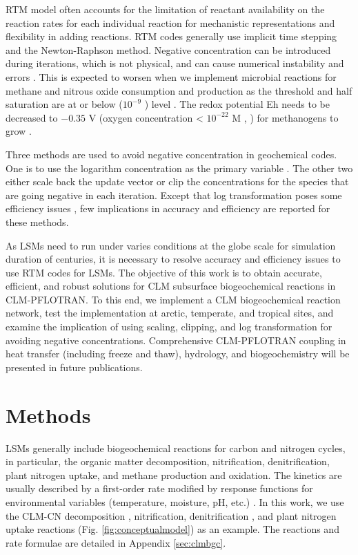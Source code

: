 \documentclass[gmd, manuscript]{copernicus}
\begin{document}
RTM model often accounts for the limitation of reactant availability on the reaction rates for each individual reaction for mechanistic representations and flexibility in adding reactions. RTM codes generally use implicit time stepping and the Newton-Raphson method. Negative concentration can be introduced during iterations, which is not physical, and can cause numerical instability and errors \citep{Shampine2005}. This is expected to worsen when we implement microbial reactions for methane and nitrous oxide consumption and production as the threshold and half saturation are at or below  ($10^{-9}$ ) level \citep{Conrad1996}. The redox potential Eh needs to be decreased to $-0.35$ \unit{V} (oxygen concentration < $10^{-22}$ \unit{M} \citeauthor{Hungate1975}, \citeyear{Hungate1975}) for methanogens to grow \citep{Jarrell1985}. 

Three methods are used to avoid negative concentration in geochemical codes. One is to use the logarithm concentration as the primary variable
\citep{Bethke2007,Hammond2003,Parkhurst1999}. The other two either scale back the update vector \citep{Bethke2007,Hammond2003} or clip the concentrations for the species that are going negative \citep{Yeh2004,White2005,Xu2014} in each iteration. Except that log transformation poses some efficiency issues \citep{Hammond2003}, few implications in accuracy and efficiency are reported  for these methods. 

As LSMs need to run under varies conditions at the globe scale for simulation duration of centuries, it is necessary to resolve accuracy and efficiency
issues to use RTM codes for LSMs. The objective of this work is to obtain accurate, efficient, and robust solutions for CLM subsurface biogeochemical reactions in CLM-PFLOTRAN. To this end, we implement a CLM biogeochemical reaction network, test the implementation at arctic, temperate, and
tropical sites, and examine the implication of using scaling, clipping, and log transformation for avoiding negative concentrations.  Comprehensive CLM-PFLOTRAN coupling in heat transfer (including freeze and thaw), hydrology,  and biogeochemistry will be presented in future publications.  

\section{Methods}
LSMs generally include biogeochemical reactions for carbon and nitrogen cycles, in particular, the organic matter decomposition, nitrification, denitrification, plant nitrogen uptake,  and methane production and oxidation. The kinetics are usually described by a first-order rate modified by response functions for environmental variables (temperature, moisture, pH, etc.) \citep{Bonan2012,Boyer2006,Schmidt2011}.  In this work, we use the CLM-CN decomposition \citep{Bonan2012,Oleson2013,Thornton2005}, nitrification, denitrification \citep{Dickinson2002,Parton2001,Parton1996}, and plant nitrogen uptake reactions (Fig. \ref{fig:conceptualmodel}) as an example. The reactions and rate formulae are detailed in Appendix \ref{sec:clmbgc}.
\end{document}
